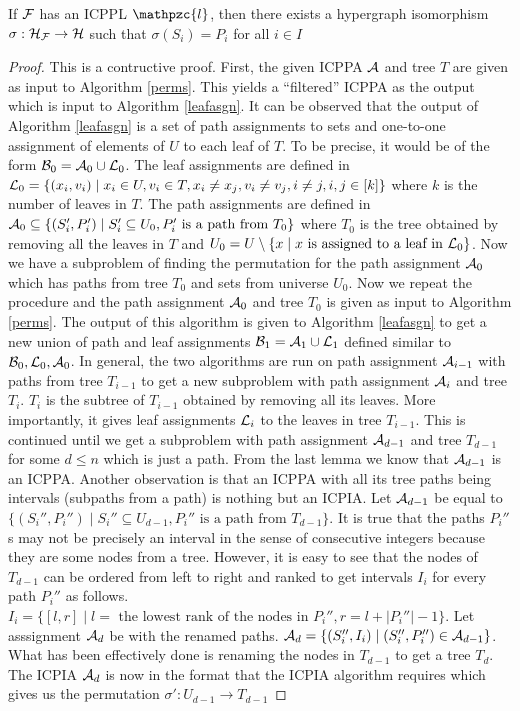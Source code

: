 \documentclass{llncs}
\def\cA{{\cal A}}
\def\cB{{\cal B}}
\def\cF{{\cal F}}
\def\cH{{\cal H}}
\def\cL{{\cal L}}
\def\cl{\mathpzc{l}}
\begin{document}
\begin{theorem}
\label{th:perm}
  If $\cF$ has an ICPPL $\cl$, then there exists a hypergraph
  isomorphism $\sigma : \cH_\cF \rightarrow \cH$ such that $\sigma(S_i) = P_i$ for all $i \in I$
\end{theorem}
\begin{proof}
This is a contructive proof. First, the given ICPPA $\cA$ and tree $T$ are given as input to Algorithm
\ref{perms}. This yields a ``filtered'' ICPPA as the output which is
input to Algorithm \ref{leafasgn}.
It can be observed that the output of Algorithm \ref{leafasgn} is a set of path
assignments to sets and one-to-one assignment of elements of $U$ to
each leaf of $T$. To be precise, it would be of the form $\cB_0 =
\cA_0 \cup \cL_0$. The leaf assignments are defined in $\cL_0
= \{ (x_i,v_i) \mid x_i \in U, v_i \in T, x_i \ne x_j, v_i \ne v_j, i \ne j, i,j \in [k] \}$ where $k$ is the
number of leaves in $T$. The path assignments are defined in $\cA_0
\subseteq \{(S_i',P_i') \mid S_i' \subseteq U_0, P_i' \text{ is a path
  from } T_0\}$ where $T_0$ is the tree obtained by removing all the
leaves in $T$ and $U_0 = U \setminus \{ x \mid x \text{ is assigned to
  a leaf in }\cL_0 \}$. Now we have a subproblem of finding the
permutation for the path assignment $\cA_0$ which has paths from tree
$T_0$ and sets from universe $U_0$. Now we repeat the procedure and the path assignment $\cA_0$ and tree $T_0$
is given as input to Algorithm \ref{perms}. The output of this
algorithm is given to Algorithm \ref{leafasgn} to get a new
union of path and leaf assignments $\cB_1 =
\cA_1 \cup \cL_1$ defined similar to $\cB_0, \cL_0, \cA_0$. In
general, the two algorithms are run on
path assignment $\cA_{i-1}$ with paths from tree $T_{i-1}$ to get a new
subproblem with path assignment $\cA_i$ and tree $T_{i}$. $T_i$ is
the subtree of $T_{i-1}$ obtained by removing all its leaves. More importantly, it gives leaf
assignments $\cL_{i}$ to the leaves in tree $T_{i-1}$. This is
continued until we get a subproblem with path assignment $\cA_{d-1}$ and
tree $T_{d-1}$ for some $d \le n$ which is just a
path. From the last lemma we know that $\cA_{d-1}$ is an
ICPPA. Another observation is that an ICPPA with all its tree paths
being intervals (subpaths from a path) is nothing but an ICPIA\cite{nsnrs09}.
Let $\cA_{d-1}$ be equal to $\{(S_i'',P_i'') \mid S_i'' \subseteq U_{d-1}, P_i'' \text{ is a path
  from } T_{d-1} \}$. It is true that the paths $P_i''$s
may not be precisely an interval in the sense of consecutive integers
because they are some nodes from a tree. However, it is easy to see that
the nodes of $T_{d-1}$ can be ordered from left to right and ranked to get
intervals $I_i$ for every path $P_i''$ as follows. $I_i = \{[l,r]
\mid l = \text{ the lowest rank of the nodes in }P_i'', r = l+|P_i''|-1
\}$. Let asssignment $\cA_d$ be with the renamed paths. $\cA_d = \{ (S_i'', I_i) \mid (S_i'', P_i'') \in \cA_{d-1}
\}$. What has been effectively done is renaming the nodes in $T_{d-1}$
to get a tree $T_d$.
The ICPIA $\cA_d$ is now in the format that the ICPIA algorithm
requires which gives us the permutation $\sigma' : U_{d-1} \rightarrow T_{d-1}$


\end{proof}
\end{document}
